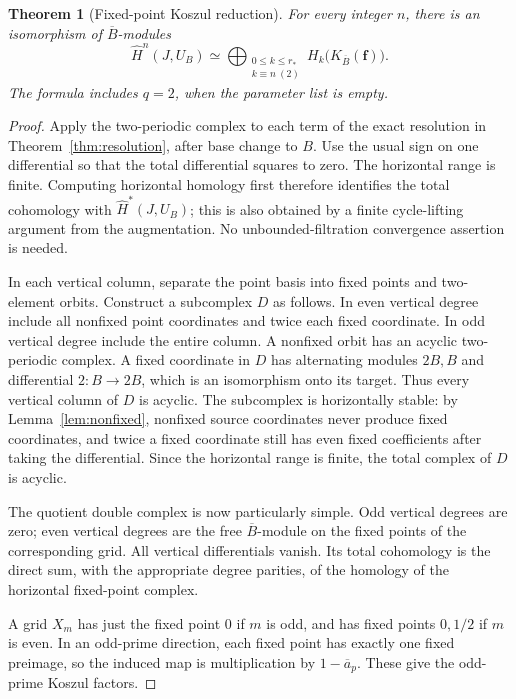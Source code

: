 \documentclass[11pt]{article}
\numberwithin{equation}{section}
\newtheorem{theorem}{Theorem}[section]
\theoremstyle{definition}
\theoremstyle{remark}
\newcommand{\HH}{\widehat H}
\begin{document}
\begin{theorem}[Fixed-point Koszul reduction]
\label{thm:koszul}
For every integer $n$, there is an isomorphism of $\overline B$-modules
\begin{equation}
 \HH^n(J,U_B)\simeq
 \bigoplus_{\substack{0\le k\le r_*\\k\equiv n\ (2)}}
 H_k\bigl(K_{\overline B}(\boldsymbol f)\bigr).
 \label{eq:tate-koszul}
\end{equation}
The formula includes $q=2$, when the parameter list is empty.
\end{theorem}
\begin{proof}
Apply the two-periodic complex to each term of the exact resolution
in Theorem~\ref{thm:resolution}, after base change to $B$.
Use the usual sign on one differential so that the total differential
squares to zero. The horizontal range is finite. Computing horizontal
homology first therefore identifies the total cohomology with
$\HH^*(J,U_B)$; this is also obtained by a finite cycle-lifting argument
from the augmentation. No unbounded-filtration convergence assertion is
needed.

In each vertical column, separate the point basis into fixed points and
two-element orbits. Construct a subcomplex $D$ as follows. In even
vertical degree include all nonfixed point coordinates and twice each
fixed coordinate. In odd vertical degree include the entire column.
A nonfixed orbit has an acyclic two-periodic complex. A fixed coordinate
in $D$ has alternating modules $2B,B$ and differential $2:B\to2B$,
which is an isomorphism onto its target. Thus every vertical column of
$D$ is acyclic. The subcomplex is horizontally stable: by
Lemma~\ref{lem:nonfixed}, nonfixed source coordinates never produce
fixed coordinates, and twice a fixed coordinate still has even fixed
coefficients after taking the differential. Since the horizontal range
is finite, the total complex of $D$ is acyclic.

The quotient double complex is now particularly simple. Odd vertical
degrees are zero; even vertical degrees are the free $\overline B$-module
on the fixed points of the corresponding grid. All vertical
differentials vanish. Its total cohomology is the direct sum, with the
appropriate degree parities, of the homology of the horizontal
fixed-point complex.

A grid $X_m$ has just the fixed point $0$ if $m$ is odd, and has fixed
points $0,1/2$ if $m$ is even. In an odd-prime direction, each fixed
point has exactly one fixed preimage, so the induced map is multiplication
by $1-\overline a_p$. These give the odd-prime Koszul factors.


\end{proof}
\end{document}
